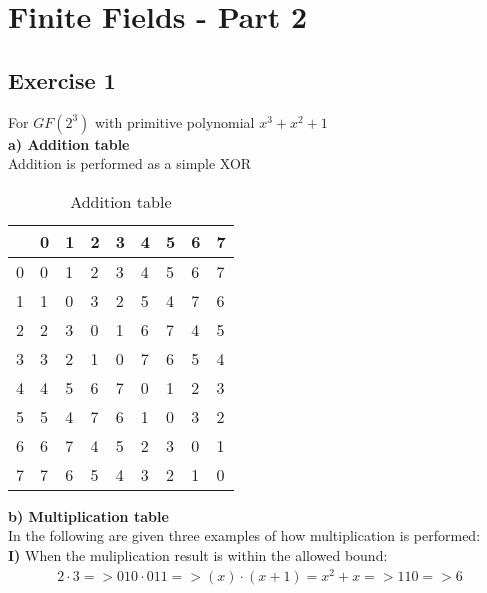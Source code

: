 \section{Finite Fields - Part 2}

\subsection{Exercise 1}
For $GF(2^3)$ with primitive polynomial $x^3+x^2+1$\\

\noindent\textbf{a) Addition table}\\
Addition is performed as a simple XOR
\begin{table}[H]
    \begin{tabularx}{\textwidth}{| Y | Y | Y | Y | Y | Y | Y | Y | Y |}
        \hline
         & 0 & 1 & 2 & 3 & 4 & 5 & 6 & 7 \\\hline
        0 & 0 & 1 & 2 & 3 & 4 & 5 & 6 & 7 \\\hline
        1 & 1 & 0 & 3 & 2 & 5 & 4 & 7 & 6 \\\hline
        2 & 2 & 3 & 0 & 1 & 6 & 7 & 4 & 5 \\\hline
        3 & 3 & 2 & 1 & 0 & 7 & 6 & 5 & 4 \\\hline
        4 & 4 & 5 & 6 & 7 & 0 & 1 & 2 & 3 \\\hline
        5 & 5 & 4 & 7 & 6 & 1 & 0 & 3 & 2 \\\hline
        6 & 6 & 7 & 4 & 5 & 2 & 3 & 0 & 1 \\\hline
        7 & 7 & 6 & 5 & 4 & 3 & 2 & 1 & 0 \\\hline
    \end{tabularx}
    \caption{Addition table}
    \label{tab:ff21a}
\end{table}
\noindent\textbf{b) Multiplication table}\\
In the following are given three examples of how multiplication is performed:\\
\textbf{I)} When the muliplication result is within the allowed bound:
\begin{align}
    2\cdot3 => 010 \cdot 011 => (x)\cdot(x+1) = x^2 + x => 110 => 6
\end{align}
